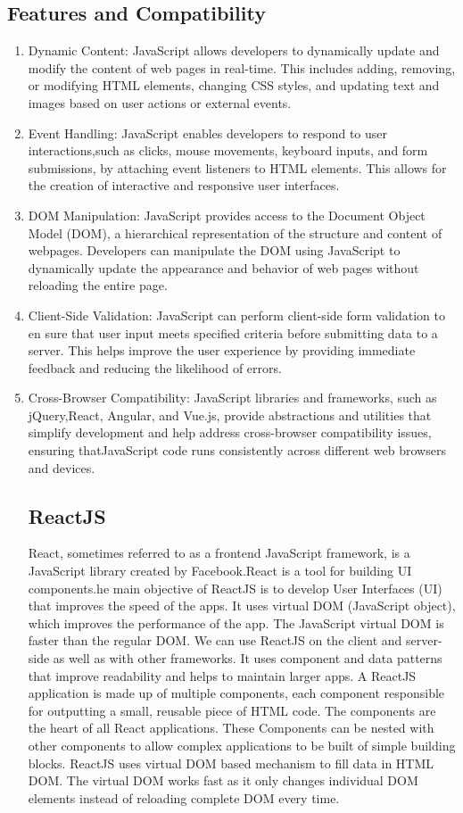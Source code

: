 \subsection*{Features and Compatibility}
\begin{enumerate}
\item Dynamic Content: JavaScript allows developers to dynamically update and modify the content of web pages in real-time. This includes adding, removing, or
modifying HTML elements, changing CSS styles, and updating text and images based on user actions or external events.
\item  Event Handling: JavaScript enables developers to respond to user interactions,such as clicks, mouse movements, keyboard inputs, and form submissions, by attaching event listeners to HTML elements. This allows for the creation of interactive and responsive user interfaces.
\item DOM Manipulation: JavaScript provides access to the Document Object Model (DOM), a hierarchical representation of the structure and content of webpages. Developers can manipulate the DOM using JavaScript to dynamically update the appearance and behavior of web pages without reloading the entire page.
\item  Client-Side Validation: JavaScript can perform client-side form validation to en	sure that user input meets specified criteria before submitting data to a server.
This helps improve the user experience by providing immediate feedback and reducing the likelihood of errors.
\item Cross-Browser Compatibility: JavaScript libraries and frameworks, such as jQuery,React, Angular, and Vue.js, provide abstractions and utilities that simplify development and help address cross-browser compatibility issues, ensuring thatJavaScript code runs consistently across different web browsers and devices.
\subsection{ReactJS} React, sometimes referred to as a frontend JavaScript framework, is a JavaScript library created by Facebook.React is a tool for building UI components.he main objective of ReactJS is to develop User Interfaces (UI) that improves the speed of the apps. It uses virtual DOM (JavaScript object), which improves the performance of the app. The JavaScript virtual DOM is faster than the regular DOM. We can use ReactJS on the client and server-side as well as with other frameworks. It uses component and data patterns that improve readability and helps to maintain larger apps.
\newline A ReactJS application is made up of multiple components, each component responsible for outputting a small, reusable piece of HTML code. The components are the heart of all React applications. These Components can be nested with other components to allow complex applications to be built of simple building blocks. ReactJS uses virtual DOM based mechanism to fill data in HTML DOM. The virtual DOM works fast as it only changes individual DOM elements instead of reloading complete DOM every time.

\end{enumerate}
